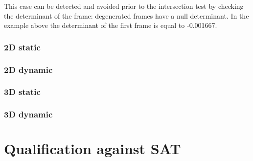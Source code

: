 \documentclass[12pt, a4paper]{article}
\begin{document}
This case can be detected and avoided prior to the intersection test by checking the determinant of the frame: degenerated frames have a null determinant. In the example above the determinant of the first frame is equal to -0.001667.

\subsubsection{2D static}

\begin{scriptsize}
\begin{ttfamily}

\end{ttfamily}
\end{scriptsize}

\subsubsection{2D dynamic}

\begin{scriptsize}
\begin{ttfamily}

\end{ttfamily}
\end{scriptsize}

\subsubsection{3D static}

\begin{scriptsize}
\begin{ttfamily}

\end{ttfamily}
\end{scriptsize}

\subsubsection{3D dynamic}

\begin{scriptsize}
\begin{ttfamily}

\end{ttfamily}
\end{scriptsize}

\section{Qualification against SAT}
\end{document}

